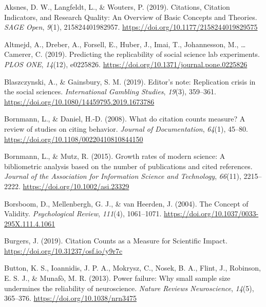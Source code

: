\documentclass[
  english,
  jou,floatsintext]{apa6}
\newlength{\cslhangindent}
\newlength{\cslentryspacingunit} %
\newenvironment{CSLReferences}[2] %
 {%
  \setlength{\parindent}{0pt}
  \ifodd #1
  \let\oldpar\par
  \def\par{\hangindent=\cslhangindent\oldpar}
  \fi
  \setlength{\parskip}{#2\cslentryspacingunit}
 }%
 {}
\begin{document}
\hypertarget{refs}{}
\begin{CSLReferences}{1}{0}
\leavevmode{}%
Aksnes, D. W., Langfeldt, L., \& Wouters, P. (2019). Citations, {Citation Indicators}, and {Research Quality}: {An Overview} of {Basic Concepts} and {Theories}. \emph{SAGE Open}, \emph{9}(1), 215824401982957. \url{https://doi.org/10.1177/2158244019829575}

\leavevmode{}%
Altmejd, A., Dreber, A., Forsell, E., Huber, J., Imai, T., Johannesson, M., \ldots{} Camerer, C. (2019). Predicting the replicability of social science lab experiments. \emph{PLOS ONE}, \emph{14}(12), e0225826. \url{https://doi.org/10.1371/journal.pone.0225826}

\leavevmode{}%
Blaszczynski, A., \& Gainsbury, S. M. (2019). Editor's note: Replication crisis in the social sciences. \emph{International Gambling Studies}, \emph{19}(3), 359--361. \url{https://doi.org/10.1080/14459795.2019.1673786}

\leavevmode{}%
Bornmann, L., \& Daniel, H.-D. (2008). What do citation counts measure? {A} review of studies on citing behavior. \emph{Journal of Documentation}, \emph{64}(1), 45--80. \url{https://doi.org/10.1108/00220410810844150}

\leavevmode{}%
Bornmann, L., \& Mutz, R. (2015). Growth rates of modern science: {A} bibliometric analysis based on the number of publications and cited references. \emph{Journal of the Association for Information Science and Technology}, \emph{66}(11), 2215--2222. \url{https://doi.org/10.1002/asi.23329}

\leavevmode{}%
Borsboom, D., Mellenbergh, G. J., \& van Heerden, J. (2004). The {Concept} of {Validity}. \emph{Psychological Review}, \emph{111}(4), 1061--1071. \url{https://doi.org/10.1037/0033-295X.111.4.1061}

\leavevmode{}%
Burgers, J. (2019). Citation {Counts} as a {Measure} for {Scientific Impact}. \url{https://doi.org/10.31237/osf.io/y9r7c}

\leavevmode{}%
Button, K. S., Ioannidis, J. P. A., Mokrysz, C., Nosek, B. A., Flint, J., Robinson, E. S. J., \& Munafò, M. R. (2013). Power failure: Why small sample size undermines the reliability of neuroscience. \emph{Nature Reviews Neuroscience}, \emph{14}(5), 365--376. \url{https://doi.org/10.1038/nrn3475}


\end{CSLReferences}
\end{document}
